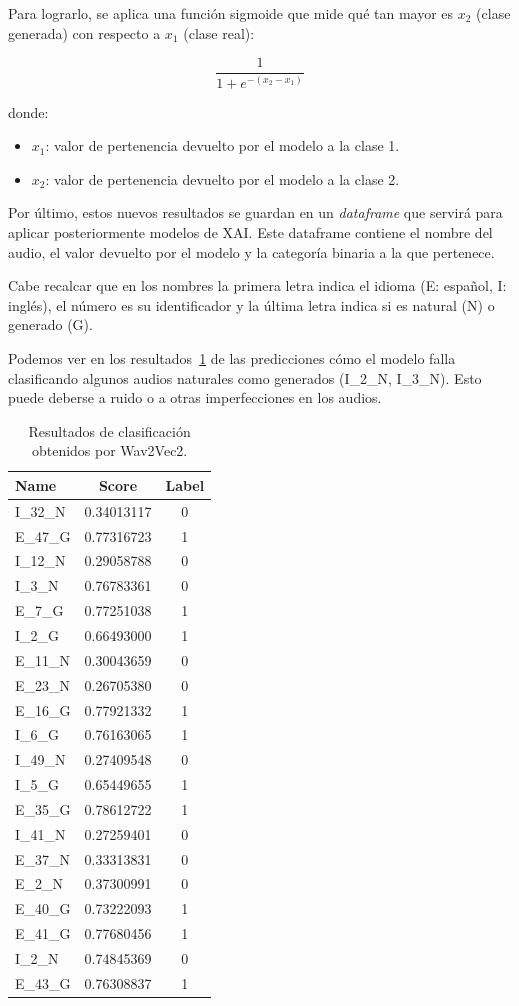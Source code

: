 Para lograrlo, se aplica una función sigmoide que mide qué tan mayor es $x_2$ (clase generada) con respecto a $x_1$ (clase real):

\[
\frac{1}{1 + e^{-(x_2 - x_1)}}
\]

\noindent donde:
\begin{itemize}
 \item $x_1$: valor de pertenencia devuelto por el modelo a la clase 1.
 \item $x_2$: valor de pertenencia devuelto por el modelo a la clase 2.
\end{itemize}

Por último, estos nuevos resultados se guardan en un \textit{dataframe} que servirá para aplicar posteriormente modelos de XAI. Este dataframe contiene el nombre del audio, el valor devuelto por el modelo y la categoría binaria a la que pertenece.

Cabe recalcar que en los nombres la primera letra indica el idioma (E: español, I: inglés), el número es su identificador y la última letra indica si es natural (N) o generado (G).

Podemos ver en los resultados~\ref{tab:resultados Wav2Vec2} de las predicciones cómo el modelo falla clasificando algunos audios naturales como generados (I\_2\_N, I\_3\_N). Esto puede deberse a ruido o a otras imperfecciones en los audios.

\begin{table}
\centering

\begin{tabular}{|l|c|c|}
\hline
\textbf{Name} & \textbf{Score} & \textbf{Label} \\
\hline
I\_32\_N & 0.34013117 & 0 \\
E\_47\_G & 0.77316723 & 1 \\
I\_12\_N & 0.29058788 & 0 \\
I\_3\_N  & 0.76783361 & 0 \\
E\_7\_G  & 0.77251038 & 1 \\
I\_2\_G  & 0.66493000 & 1 \\
E\_11\_N & 0.30043659 & 0 \\
E\_23\_N & 0.26705380 & 0 \\
E\_16\_G & 0.77921332 & 1 \\
I\_6\_G  & 0.76163065 & 1 \\
I\_49\_N & 0.27409548 & 0 \\
I\_5\_G  & 0.65449655 & 1 \\
E\_35\_G & 0.78612722 & 1 \\
I\_41\_N & 0.27259401 & 0 \\
E\_37\_N & 0.33313831 & 0 \\
E\_2\_N  & 0.37300991 & 0 \\
E\_40\_G & 0.73222093 & 1 \\
E\_41\_G & 0.77680456 & 1 \\
I\_2\_N  & 0.74845369 & 0 \\
E\_43\_G & 0.76308837 & 1 \\
\hline
\end{tabular}
\caption{Resultados de clasificación obtenidos por Wav2Vec2.}
\label{tab:resultados Wav2Vec2}
\end{table}


